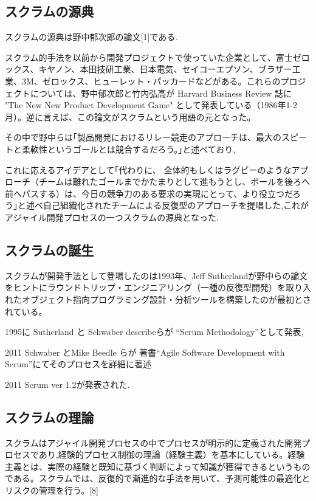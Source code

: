 \documentclass[paper]{jrsj}
\begin{document}
\subsection{スクラムの源典}
スクラムの源典は野中郁次郎の論文[1]である.

スクラム的手法を以前から開発プロジェクトで使っていた企業として、富士ゼロックス、キヤノン、本田技研工業、日本電気、セイコーエプソン、ブラザー工業、3M、ゼロックス、ヒューレット・パッカードなどがある。これらのプロジェクトについては、野中郁次郎と竹内弘高が Harvard Business Review 誌に "The New New Product Development Game" として発表している（1986年1-2月）。逆に言えば、この論文がスクラムという用語の元となった。

その中で野中らは｢製品開発におけるリレー競走のアプローチは、最大のスピートと柔軟性というゴールとは競合するだろう。｣と述べており,

これに応えるアイデアとして｢代わりに、 全体的もしくはラグビーのようなアプローチ（チームは離れたゴールまでかたまりとして進もうとし、ボールを後ろへ前へパスする）は、今日の競争力のある要求の実現にとって、より役立つだろう｣と述べ自己組織化されたチームによる反復型のアプローチを提唱した,これがアジャイル開発プロセスの一つスクラムの源典となった.

\subsection{スクラムの誕生}


スクラムが開発手法として登場したのは1993年、Jeff Sutherlandが野中らの論文をヒントにラウンドトリップ・エンジニアリング（一種の反復型開発）を取り入れたオブジェクト指向プログラミング設計・分析ツールを構築したのが最初とされている。

1995に Sutherland と Schwaber describeらが “Scrum Methodology”として発表,

2011  Schwaber とMike Beedle らが 著書“Agile Software Development with Scrum”にてそのプロセスを詳細に著述

2011  Scrum ver 1.2が発表された.

\subsection{スクラムの理論}
スクラムはアジャイル開発プロセスの中でプロセスが明示的に定義された開発プロセスであり,経験的プロセス制御の理論（経験主義）を基本にしている。経験主義とは、実際の経験と既知に基づく判断によって知識が獲得できるというものである。スクラムでは、反復的で漸進的な手法を用いて、予測可能性の最適化とリスクの管理を行う。[8]
\end{document}
